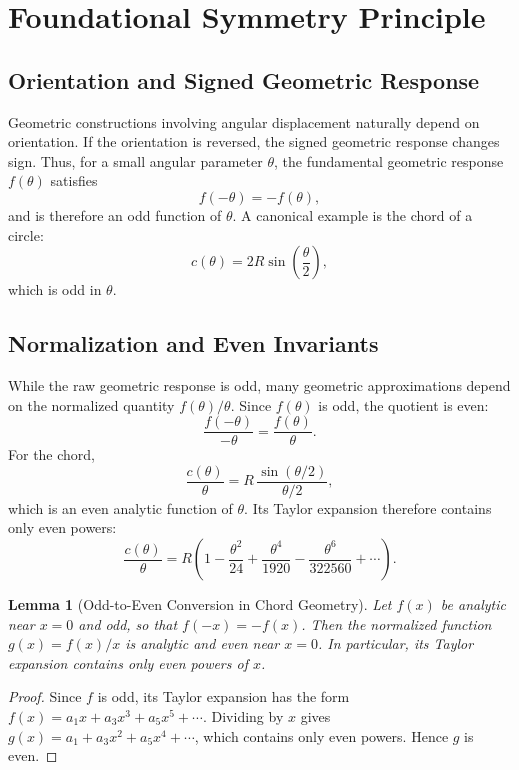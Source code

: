 \documentclass[12pt]{article}
\newtheorem{lemma}[theorem]{Lemma}
\theoremstyle{remark}
\begin{document}
\section{Foundational Symmetry Principle}
\label{sec:symmetry}
\subsection{Orientation and Signed Geometric Response}

Geometric constructions involving angular displacement naturally depend on
orientation. If the orientation is reversed, the signed geometric response
changes sign. Thus, for a small angular parameter $\theta$, the fundamental
geometric response $f(\theta)$ satisfies
\[
  f(-\theta) = -f(\theta),
\]
and is therefore an odd function of $\theta$. A canonical example is the
chord of a circle:
\[
  c(\theta) = 2R\sin\!\left(\frac{\theta}{2}\right),
\]
which is odd in $\theta$.

\subsection{Normalization and Even Invariants}

While the raw geometric response is odd, many geometric approximations depend
on the normalized quantity $f(\theta)/\theta$. Since $f(\theta)$ is odd, the
quotient is even:
\[
  \frac{f(-\theta)}{-\theta} = \frac{f(\theta)}{\theta}.
\]
For the chord,
\[
  \frac{c(\theta)}{\theta} = R\,\frac{\sin(\theta/2)}{\theta/2},
\]
which is an even analytic function of $\theta$. Its Taylor expansion therefore
contains only even powers:
\[
  \frac{c(\theta)}{\theta}
  = R\!\left(1 - \frac{\theta^2}{24} + \frac{\theta^4}{1920}
    - \frac{\theta^6}{322560} + \cdots\right).
\]

\begin{lemma}[Odd-to-Even Conversion in Chord Geometry]
Let $f(x)$ be analytic near $x=0$ and odd, so that $f(-x)=-f(x)$.
Then the normalized function $g(x)=f(x)/x$ is analytic and even near $x=0$.
In particular, its Taylor expansion contains only even powers of $x$.
\end{lemma}

\begin{proof}
Since $f$ is odd, its Taylor expansion has the form
$f(x)=a_1x+a_3x^3+a_5x^5+\cdots$.
Dividing by $x$ gives $g(x)=a_1+a_3x^2+a_5x^4+\cdots$,
which contains only even powers. Hence $g$ is even.
\end{proof}
\end{document}
